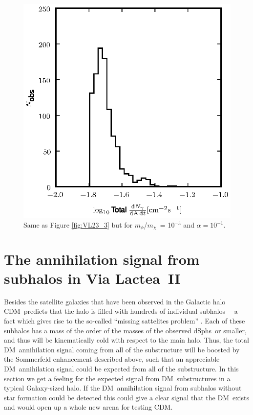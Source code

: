 \documentclass[aps,prd,twocolumn,amsmath,amssymb,floatfix,nofootinbib,10pt]{revtex4}
\newcommand{\VL}{Via Lactea}
\newcommand{\CDM}{CDM}
\newcommand{\DM}{DM}
\newcommand{\mdm}{\ensuremath{m_{\chi}}}
\newcommand{\mv}{\ensuremath{m_{\phi}}}
\newcommand{\dSphs}{dSphs}
\begin{document}
\begin{figure}
\centering
\includegraphics{hist_-5_-1_10_3.eps}
\caption{Same as Figure \ref{fig:VL23_3} but for \mv/\mdm\ = 10$^{-5}$
and $\alpha = 10^{-1}$.}%
\label{fig:VL51_2}%
\end{figure}










\section{The annihilation signal from subhalos in \VL\ II}

Besides the satellite galaxies that have been observed in the Galactic
halo \CDM\ predicts that the halo is filled with hundreds of
individual subhalos ---a fact which gives rise to the so-called
``missing sattelites problem''
\cite{1999ApJ...522...82K,1999ApJ...524L..19M}. Each of these subhalos
has a mass of the order of the masses of the observed \dSphs\ or
smaller, and thus will be kinematically cold with respect to the main
halo. Thus, the total \DM\ annihilation signal coming from all of the
substructure will be boosted by the Sommerfeld enhancement described
above, such that an appreciable \DM\ annihilation signal could be
expected from all of the substructure. In this section we get a
feeling for the expected signal from \DM\ substructures in a typical
Galaxy-sized halo. If the \DM\ annihilation signal from subhalos
without star formation could be detected this could give a clear
signal that the \DM\ exists and would open up a whole new arena for
testing \CDM.
\end{document}
